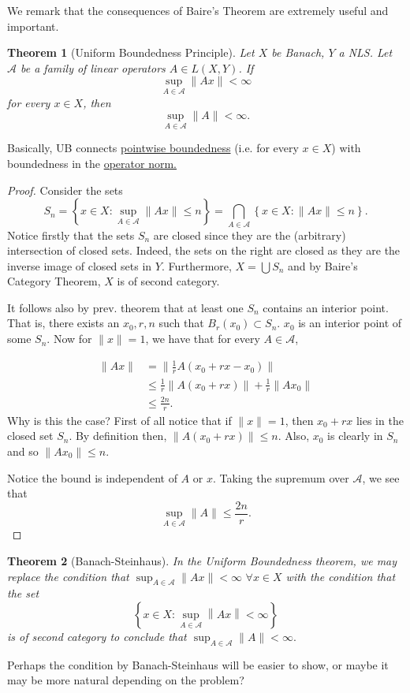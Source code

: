 \documentclass[letterpaper,twoside,11pt]{article}
\theoremstyle{mystyle}
\newtheorem*{thm}{Theorem}		%
\newcommand{\cg}{\color{gray}}
\newcommand{\cbk}{\color{black}}
\begin{document}
We remark that the consequences of Baire's Theorem are extremely useful and important. 
\begin{tcolorbox}[colback=red!5!white,colframe=red!75!black]
  \begin{thm}[Uniform Boundedness Principle]
  Let $X$ be Banach, $Y$ a NLS. Let $\mathcal A $ be a family of linear operators $A\in L(X, Y)$. If \[\sup_{A\in \mathcal A} \|Ax\|< \infty \] for every $x\in X$, then 
  \[\sup_{A\in \mathcal A} \|A\| < \infty.\]
\end{thm}
\end{tcolorbox}
\cg Basically, UB connects \underline{pointwise boundedness} (i.e. for every $x\in X$) with boundedness in the \underline{operator norm.} \cbk
\begin{proof}
  Consider the sets 
  \[S_n = \left\{ x\in X : \sup_{A\in \mathcal A}\|Ax\|\leq n\right\} = \bigcap_{A\in \mathcal A} \left\{ x\in X : \|Ax\|\leq n\right\}. \]
  Notice firstly that the sets $S_n$ are closed since they are the (arbitrary) intersection of closed sets. Indeed, the sets on the right are closed as they are the inverse image of closed sets in $Y$. Furthermore, $X = \bigcup S_n$ and by Baire's Category Theorem, $X$ is of second category. 

  It follows also by prev. theorem that at least one $S_n$ contains an interior point. That is, there exists an $x_0, r, n$ such that $B_r(x_0) \subset S_n$. \cg $x_0$ is an interior point of some $S_n$. \cbk Now for $\|x\|=1$, we have that for every $A\in \mathcal A$, 

  \begin{align*}
    \|Ax\| &= \|\frac{1}{r}A(x_0 + rx - x_0)\| \\[.2cm]
    &\leq \frac{1}{r}\|A(x_0 + rx)\| + \frac{1}{r}\|Ax_0\| \\[.2cm]
    &\leq \frac{2n}{r}.
  \end{align*}
  Why is this the case? First of all notice that if $\|x\|=1$, then $x_0 + r x$ lies in the closed set $S_n$. By definition then, $\|A(x_0 + rx)\|\leq n$. Also, $x_0$ is clearly in $S_n$ and so $\|Ax_0\| \leq n$. 

  Notice the bound is independent of $A$ or $x$. Taking the supremum over $\mathcal A$, we see that 
  \[\sup_{A\in \mathcal A} \|A\| \leq \frac{2n}{r}. \]
\end{proof}
\begin{tcolorbox}[colback=red!5!white,colframe=red!75!black]
\begin{thm}[Banach-Steinhaus]
  In the Uniform Boundedness theorem, we may replace the condition that $\sup_{A\in \mathcal A} \|Ax\| < \infty \,\, \forall x\in X$ with the condition that the set  
  \[\left\{ {x \in X:\mathop {\sup }\limits_{A \in \mathcal{A}} \left\| {Ax} \right\| < \infty } \right\}\] is of second category to conclude that $\sup_{A\in \mathcal A} \|A\| < \infty.$
\end{thm}
\end{tcolorbox}
\cg Perhaps the condition by Banach-Steinhaus will be easier to show, or maybe it may be more natural depending on the problem? \cbk
\end{document}
